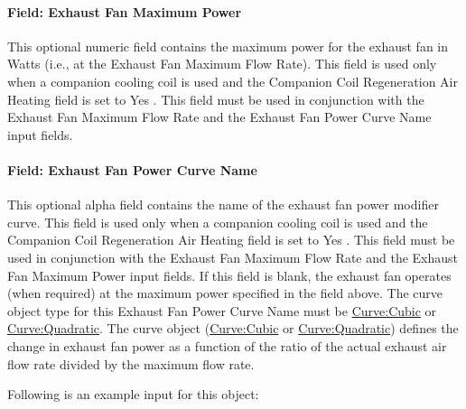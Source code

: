 \paragraph{Field: Exhaust Fan Maximum Power}\label{field-exhaust-fan-maximum-power}

This optional numeric field contains the maximum power for the exhaust fan in Watts (i.e., at the Exhaust Fan Maximum Flow Rate). This field is used only when a companion cooling coil is used and the Companion Coil Regeneration Air Heating field is set to Yes . This field must be used in conjunction with the Exhaust Fan Maximum Flow Rate and the Exhaust Fan Power Curve Name input fields.

\paragraph{Field: Exhaust Fan Power Curve Name}\label{field-exhaust-fan-power-curve-name}

This optional alpha field contains the name of the exhaust fan power modifier curve. This field is used only when a companion cooling coil is used and the Companion Coil Regeneration Air Heating field is set to Yes . This field must be used in conjunction with the Exhaust Fan Maximum Flow Rate and the Exhaust Fan Maximum Power input fields. If this field is blank, the exhaust fan operates (when required) at the maximum power specified in the field above. The curve object type for this Exhaust Fan Power Curve Name must be \hyperref[curvecubic]{Curve:Cubic} or \hyperref[curvequadratic]{Curve:Quadratic}. The curve object (\hyperref[curvecubic]{Curve:Cubic} or \hyperref[curvequadratic]{Curve:Quadratic}) defines the change in exhaust fan power as a function of the ratio of the actual exhaust air flow rate divided by the maximum flow rate.

Following is an example input for this object:


